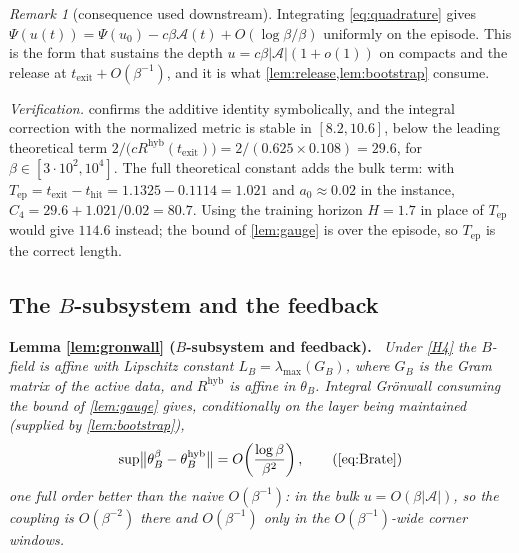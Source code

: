 \documentclass[11pt]{article}
\theoremstyle{definition}
\theoremstyle{remark}
\newtheorem{remark}[remark]{Remark}
\newcommand{\thit}{t_{\mathrm{hit}}}
\newcommand{\texit}{t_{\mathrm{exit}}}
\newcommand{\Ar}{\mathcal{A}}                      %
\newcommand{\Tep}{T_{\mathrm{ep}}}   %
\newcommand{\hyb}{\mathrm{hyb}}
\newenvironment{lemmarep}[2]{%
  \par\medskip\noindent\textbf{Lemma \ref{#1} (#2).}\itshape\ \ignorespaces}%
  {\par\medskip}
\begin{document}
\begin{remark}[consequence used downstream]\label{rem:L1cons}
Integrating \eqref{eq:quadrature} gives
$\Psi(u(t))=\Psi(u_0)-c\beta\Ar(t)+O(\log\beta/\beta)$ uniformly on the episode.
This is the form that sustains the depth $u=c\beta|\Ar|(1+o(1))$ on compacts and
the release at $\texit+O(\beta^{-1})$, and it is what
\cref{lem:release,lem:bootstrap} consume.
\end{remark}

\noindent\emph{Verification.}  confirms the
additive identity symbolically, and the integral correction with the normalized
metric is stable in $[8.2,10.6]$, below the leading theoretical term
$2/\bigl(cR^{\hyb}(\texit)\bigr)=2/(0.625\times0.108)=29.6$, for
$\beta\in[3\cdot10^2,10^4]$. The full theoretical constant adds the bulk term:
with $\Tep=\texit-\thit=1.1325-0.1114=1.021$ and $a_0\approx0.02$ in the instance,
$C_4=29.6+1.021/0.02=80.7$. Using the training horizon $H=1.7$ in place of $\Tep$
would give $114.6$ instead; the bound of \cref{lem:gauge} is over the episode,
so $\Tep$ is the correct length.

\subsection{The \texorpdfstring{$B$}{B}-subsystem and the feedback}\label{app:L2}

\begin{lemmarep}{lem:gronwall}{$B$-subsystem and feedback}
Under \eqref{H4} the $B$-field is affine with Lipschitz constant
$L_B=\lambda_{\max}(G_B)$, where $G_B$ is the Gram matrix of the active data, and
$R^{\hyb}$ is affine in $\theta_B$. Integral Gr\"onwall consuming the bound of
\cref{lem:gauge} gives, conditionally on the layer being maintained (supplied by
\cref{lem:bootstrap}),
\begin{equation*}
\sup\bigl\|\theta_B^\beta-\theta_B^{\hyb}\bigr\|=O\!\left(\frac{\log\beta}{\beta^{2}}\right),
\tag{\ref{eq:Brate}}
\end{equation*}
one full order better than the naive $O(\beta^{-1})$: in the bulk
$u=O(\beta|\Ar|)$, so the coupling is $O(\beta^{-2})$ there and $O(\beta^{-1})$
only in the $O(\beta^{-1})$-wide corner windows.
\end{lemmarep}
\end{document}
